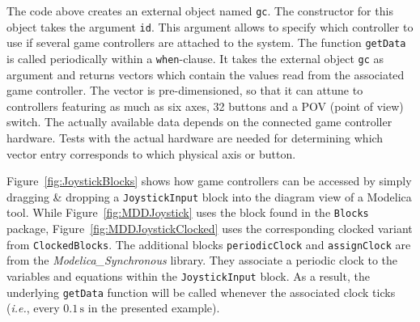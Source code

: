 \documentclass{resources/modelica}
\newcommand{\modelica}[1]{\lstinline[language=modelica]|#1|}
\begin{document}
\noindent
The code above creates an external object named \mbox{\modelica{gc}.}
The constructor for this object takes the argument \mbox{\modelica{id}.} This
argument allows to specify which controller to use if several game controllers
are attached to the system. The function \modelica{getData} is called
periodically within a \modelica{when}-clause. It takes the external object
\modelica{gc} as argument and returns vectors which contain the values read from
the associated game controller. The vector is pre-dimensioned, so that it can
attune to controllers featuring as much as six axes, 32 buttons and a POV (point
of view) switch. The actually available data depends on the connected game
controller hardware. Tests with the actual hardware are needed for determining
which vector entry corresponds to which physical axis or button.

Figure~\ref{fig:JoystickBlocks} shows how game controllers can be accessed by
simply dragging \& dropping a \modelica{JoystickInput} block into the diagram
view of a Modelica tool.
While Figure~\ref{fig:MDDJoystick} uses the block found
in the \modelica{Blocks} package,
Figure~\ref{fig:MDDJoystickClocked} uses the corresponding clocked variant from
\modelica{ClockedBlocks}. The additional blocks \modelica{periodicClock} and
\modelica{assignClock} are from the \emph{Modelica\_Synchronous} library. They
associate a periodic clock to the variables and equations within the
\modelica{JoystickInput} block. As a result, the underlying
\modelica{getData} function will be called whenever the
associated clock ticks (\textit{i.e.}, every $0.1\,\mathrm{s}$ in the presented
example).
\end{document}
